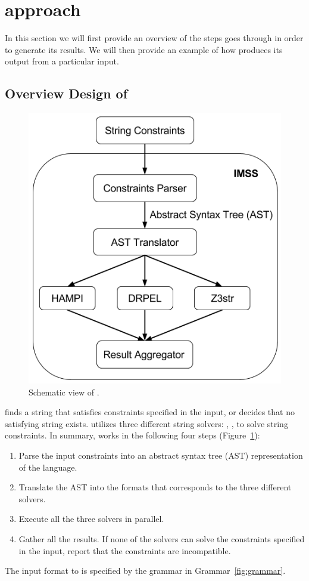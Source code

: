 \section{approach}
\label{sec:approach}

In this section we will first provide an overview of the steps \imss goes through
in order to generate its results. We will then provide an example of how \imss
produces its output from a particular input.

\subsection{Overview Design of \imss}
\begin{figure}[H]
    \center
    \includegraphics[scale=0.45]{imss}
    \caption{\label{fig:imss}Schematic view of \imss.}
\end{figure}
\imss finds a string that satisfies constraints specified in the input,
or decides that no satisfying string exists. \imss utilizes three different
string solvers: \hampi, \dprle, \zstr to solve string
constraints. In summary, \imss works in the following four steps (Figure~\ref{fig:imss}):
\begin{enumerate}
    \item Parse the input constraints into an abstract syntax tree (AST)
    representation of the \imss language.
    \item Translate the AST into the formats that corresponds to the three different solvers.
    \item Execute all the three solvers in parallel.
    \item Gather all the results. If none of the solvers can solve the constraints
    specified in the input, report that the constraints are incompatible.
\end{enumerate}
The input format to \imss is specified by the grammar in Grammar~\ref{fig:grammar}.

